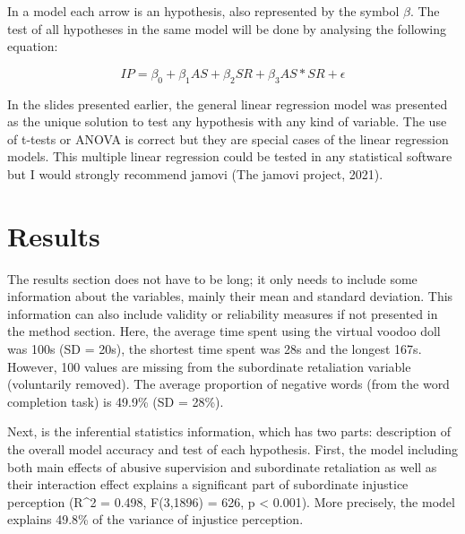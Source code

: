\documentclass[
]{article}
\begin{document}
In a model each arrow is an hypothesis, also represented by the symbol
\(\beta\). The test of all hypotheses in the same model will be done by
analysing the following equation:

\[ IP = \beta_0 + \beta_1 AS + \beta_2 SR + \beta_3 AS * SR + \epsilon \]

In the slides presented earlier, the general linear regression model was
presented as the unique solution to test any hypothesis with any kind of
variable. The use of t-tests or ANOVA is correct but they are special
cases of the linear regression models. This multiple linear regression
could be tested in any statistical software but I would strongly
recommend jamovi (The jamovi project, 2021).

\hypertarget{results}{%
\section{Results}\label{results}}

The results section does not have to be long; it only needs to include
some information about the variables, mainly their mean and standard
deviation. This information can also include validity or reliability
measures if not presented in the method section. Here, the average time
spent using the virtual voodoo doll was 100s (SD = 20s), the shortest
time spent was 28s and the longest 167s. However, 100 values are missing
from the subordinate retaliation variable (voluntarily removed). The
average proportion of negative words (from the word completion task) is
49.9\% (SD = 28\%).

Next, is the inferential statistics information, which has two parts:
description of the overall model accuracy and test of each hypothesis.
First, the model including both main effects of abusive supervision and
subordinate retaliation as well as their interaction effect explains a
significant part of subordinate injustice perception (R\^{}2 = 0.498,
F(3,1896) = 626, p \textless{} 0.001). More precisely, the model
explains 49.8\% of the variance of injustice perception.
\end{document}
